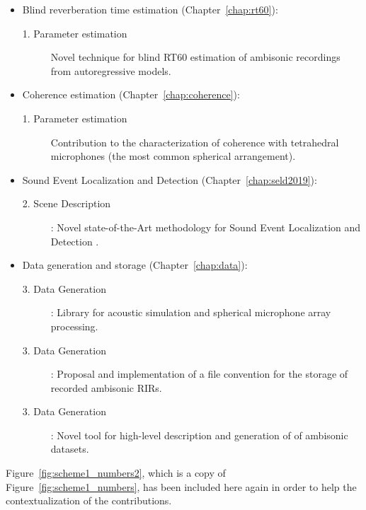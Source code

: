   \begin{itemize}

  	 \item Blind reverberation time estimation (Chapter~\ref{chap:rt60}):
  	\begin{description}
  		\item [1. Parameter estimation] Novel technique for blind RT60 estimation of ambisonic recordings from autoregressive models.
	\end{description}

  
  	\item Coherence estimation (Chapter~\ref{chap:coherence}):
  	\begin{description}
  		\item [1. Parameter estimation] Contribution to the characterization of coherence with tetrahedral microphones (the most common spherical arrangement).
	\end{description}


  	\item Sound Event Localization and Detection (Chapter~\ref{chap:seld2019}):
  	\begin{description}
  		\item [2. Scene Description]: Novel state-of-the-Art methodology for Sound Event Localization and Detection	.
  	\end{description}
  	
  	\item Data generation and storage (Chapter~\ref{chap:data}):
  		\begin{description}
  			\item [3. Data Generation]: Library for acoustic simulation and spherical microphone array processing.
  			\item [3. Data Generation]: Proposal and implementation of a file convention for the storage of recorded ambisonic RIRs.
  			\item [3. Data Generation]: Novel tool for high-level description and generation of of ambisonic datasets.

 		\end{description}

  \end{itemize}
  
   
Figure~\ref{fig:scheme1_numbers2}, which is a copy of Figure~\ref{fig:scheme1_numbers}, 
 has been included here again in order to help the contextualization of the contributions. 

